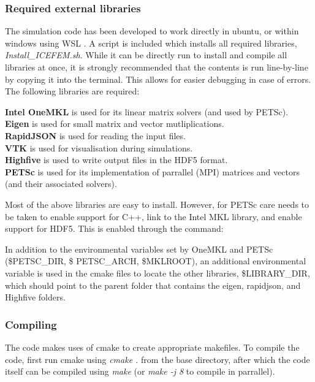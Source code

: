 \documentclass[3p]{elsarticle} %
\newcommand{\CodeSnipU}[4]{}
\begin{document}
\subsubsection{Required external libraries}
The simulation code has been developed to work directly in ubuntu, or within windows using WSL \citep{mattwojo}. A script is included which installs all required libraries, \textit{Install\_ICEFEM.sh}. While it can be directly run to install and compile all libraries at once, it is strongly recommended that the contents is run line-by-line by copying it into the terminal. This allows for easier debugging in case of errors. The following libraries are required:

\noindent \textbf{Intel OneMKL} \citep{oneMKL} is used for its linear matrix solvers (and used by PETSc).\\
\textbf{Eigen} \citep{eigen} is used for small matrix and vector mutliplications.\\
\textbf{RapidJSON} \citep{rapidjson} is used for reading the input files.\\
\textbf{VTK} \citep{VTK} is used for visualisation during simulations.\\
\textbf{Highfive} \citep{HighFive} is used to write output files in the HDF5 format.\\
\textbf{PETSc} \citep{PETSc} is used for its implementation of parrallel (MPI) matrices and vectors (and their associated solvers).

Most of the above libraries are easy to install. However, for PETSc care needs to be taken to enable support for C++, link to the Intel MKL library, and enable support for HDF5. This is enabled through the command:
\CodeSnipU{Install_ICEFEM.sh}{78}{79}{Install\_ICEFEM.sh}

In addition to the environmental variables set by OneMKL and PETSc (\$PETSC\_DIR, \$ PETSC\_ARCH, \$MKLROOT), an additional environmental variable is used in the cmake files to locate the other libraries, \$LIBRARY\_DIR, which should point to the parent folder that contains the eigen, rapidjson, and Highfive folders. 

\subsubsection{Compiling}
The code makes uses of cmake to create appropriate makefiles. To compile the code, first run cmake using \textit{cmake .} from the base directory, after which the code itself can be compiled using \textit{make} (or \textit{make -j 8} to compile in parrallel). 
\end{document}

